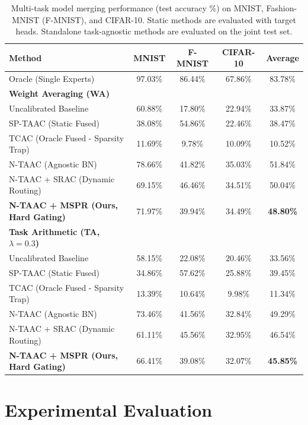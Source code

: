 \documentclass{article}
\theoremstyle{plain}
\theoremstyle{definition}
\theoremstyle{remark}
\begin{document}
\begin{table}[t]
\caption{Multi-task model merging performance (test accuracy \%) on MNIST, Fashion-MNIST (F-MNIST), and CIFAR-10. Static methods are evaluated with target heads. Standalone task-agnostic methods are evaluated on the joint test set.}
\label{table-accuracy}
\vskip 0.05in
\begin{center}
\begin{footnotesize}
\begin{tabular}{lcccc}
\toprule
Method & MNIST & F-MNIST & CIFAR-10 & Average \\
\midrule
Oracle (Single Experts) & 97.03\% & 86.44\% & 67.86\% & 83.78\% \\
\midrule
\textbf{Weight Averaging (WA)} & & & & \\
Uncalibrated Baseline & 60.88\% & 17.80\% & 22.94\% & 33.87\% \\
SP-TAAC (Static Fused) & 38.08\% & 54.86\% & 22.46\% & 38.47\% \\
TCAC (Oracle Fused - Sparsity Trap) & 11.69\% & 9.78\% & 10.09\% & 10.52\% \\
N-TAAC (Agnostic BN) & 78.66\% & 41.82\% & 35.03\% & 51.84\% \\
\midrule
N-TAAC + SRAC (Dynamic Routing) & 69.15\% & 46.46\% & 34.51\% & 50.04\% \\
\textbf{N-TAAC + MSPR (Ours, Hard Gating)} & 71.97\% & 39.94\% & 34.49\% & \textbf{48.80\%} \\
\midrule
\textbf{Task Arithmetic (TA, $\lambda = 0.3$)} & & & & \\
Uncalibrated Baseline & 58.15\% & 22.08\% & 20.46\% & 33.56\% \\
SP-TAAC (Static Fused) & 34.86\% & 57.62\% & 25.88\% & 39.45\% \\
TCAC (Oracle Fused - Sparsity Trap) & 13.39\% & 10.64\% & 9.98\% & 11.34\% \\
N-TAAC (Agnostic BN) & 73.46\% & 41.56\% & 32.84\% & 49.29\% \\
\midrule
N-TAAC + SRAC (Dynamic Routing) & 61.11\% & 45.56\% & 32.95\% & 46.54\% \\
\textbf{N-TAAC + MSPR (Ours, Hard Gating)} & 66.41\% & 39.08\% & 32.07\% & \textbf{45.85\%} \\
\bottomrule
\end{tabular}
\end{footnotesize}
\end{center}
\vskip -0.15in
\end{table}

\section{Experimental Evaluation}
\end{document}
